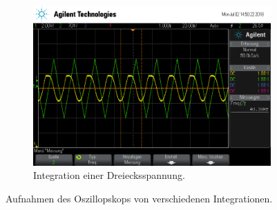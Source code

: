 \begin{figure}[ht]
\begin{subfigure}[]{\textwidth}
    \label{subfig:int_rechteck}
  \end{subfigure}
  \begin{subfigure}[]{\textwidth}
    \centering
    \includegraphics[height=0.3\textheight]{data/scope_264.png}
    \caption{Integration einer Dreiecksspannung.}
    \label{subfig:int_dreieck}
  \end{subfigure}
  \caption{Aufnahmen des Oszillopskops von verschiedenen Integrationen.}
  \label{fig:integrationen}
\end{figure}

